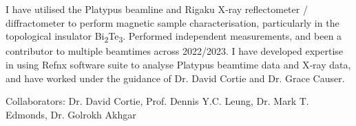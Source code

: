 \documentclass[10pt,a4paper,ragged2e,withhyper]{altacv}
\begin{document}
		{\textalignment
		I have utilised the Platypus beamline and Rigaku X‐ray reflectometer / diffractometer to perform magnetic sample characterisation, particularly in the topological insulator Bi\textsubscript{2}Te\textsubscript{3}. Performed independent measurements, and been a contributor to multiple beamtimes across 2022/2023. I have developed expertise in using Refnx software suite to analyse Platypus beamtime data and X‐ray data, and have worked under the guidance of Dr. David Cortie and Dr. Grace Causer.}

		\vspace{1em}\faUsers\hspace{4pt} Collaborators: Dr. David Cortie, Prof. Dennis Y.C. Leung, Dr. Mark T. Edmonds, Dr. Golrokh Akhgar
			
		\divider
			
\end{document}
